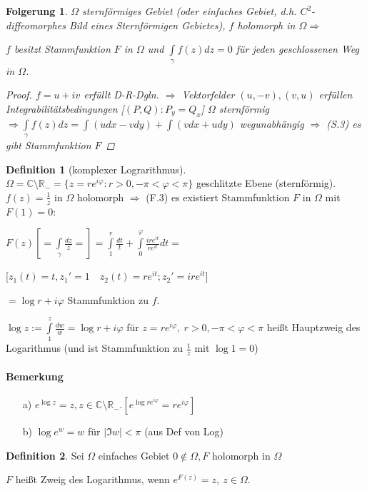 \documentclass[ngerman,halfparskip]{scrartcl}
\newtheorem{folg}{Folgerung}[section]
\theoremstyle{definition}
\newtheorem{defin}{Definition}[section]
\def\R{\mathbb R}
\def\C{\mathbb C}
\begin{document}
\begin{folg} $\Omega$ sternförmiges Gebiet (oder einfaches Gebiet, d.h. $C^2$-diffeomorphes Bild eines Sternförmigen Gebietes), $f$ holomorph in $\Omega \Rightarrow$

$f$ besitzt Stammfunktion $F$ in $\Omega$ und $\int\limits _\gamma f(z)dz=0$ für jeden geschlossenen Weg in $\Omega$.

\begin{proof}
$f=u+iv$ erfüllt D-R-Dgln. $\Rightarrow$ Vektorfelder $(u,-v),(v,u)$ erfüllen Integrabilitätsbedingungen [$(P,Q):P_y=Q_x$] $\Omega$ sternförmig $\Rightarrow \int\limits_\gamma f(z)dz=\int (udx-vdy)+\int (vdx+udy)$ wegunabhängig $\Rightarrow$ (S.3) es gibt Stammfunktion $F$
\end{proof}
\end{folg}
\begin{defin}[komplexer Lograrithmus] $\Omega=\C \setminus \R_- =\{z=re^{i\varphi}: r>0, -\pi < \varphi < \pi \}$ geschlitzte Ebene (sternförmig). $f(z)=\frac 1z$ in $\Omega$ holomorph $\Rightarrow$ (F.3) es existiert Stammfunktion $F$ in $\Omega$ mit $F(1)=0$:

$F(z)[=\int\limits_\gamma \frac{dz}{z}=]=\int\limits_1^r\frac {dt}t +\int\limits _0^\varphi \frac{ire^{it}}{re^{it}}dt=$

[$z_1(t)=t, z_1'=1 \quad z_2(t)=re^{it}; z_2'=ire^{it}$]

$=\log r +i\varphi$ Stammfunktion zu $f$.

$\log z:=\int\limits _1^z\frac{dw}w=\log r+i\varphi$ für $z=re^{i\varphi}, ~r>0, -\pi<\varphi<\pi$ heißt Hauptzweig des Logarithmus (und ist Stammfunktion zu $\frac 1z$ mit $\log 1=0$)

\end{defin}

\paragraph{Bemerkung}
\begin{itemize}
\item [a)] $e^{\log z}=z, z\in\C \setminus \R_-. [e^{\log re^{i\varphi}}=re^{i\varphi}]$
\item  [b)] $\log e^w=w$ für $ |\Im w| < \pi $ (aus Def von Log)

\end{itemize}

\begin{defin}
Sei $\Omega$ einfaches Gebiet $0\notin \Omega, F$ holomorph in $\Omega$

$F$ heißt Zweig des Logarithmus, wenn $e^{F(z)}=z, ~z\in\Omega$.
\end{defin}
\end{document}
